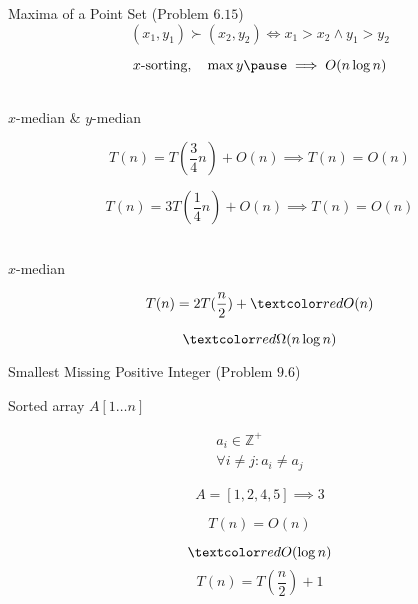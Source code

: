 \begin{frame}{}
  \begin{exampleblock}{Maxima of a Point Set (Problem $6.15$)}
    \[
      (x_1, y_1) \succ (x_2, y_2) \iff x_1 > x_2 \land y_1 > y_2
    \]
  \end{exampleblock}

  \pause
  \[
    x\text{-sorting}, \quad \max y \pause \implies O(n \log n)
  \]
\end{frame}

\begin{frame}{}
  \begin{center}
     \\[6pt]

    $x$-median \& $y$-median
  \end{center}

  \[
    T(n) = T(\frac{3}{4} n) + O(n) \implies T(n) = O(n)
  \]

  \[
    T(n) = 3T(\frac{1}{4} n) + O(n) \implies T(n) = O(n)
  \]
\end{frame}

\begin{frame}{}
  \begin{center}
      \\[6pt]

    $x$-median
  \end{center}

  \pause
  \[
    T(n) = 2T(\frac{n}{2}) + \red{O(n)}
  \]

  \pause
  \[
    \red{\Omega(n \log n)}
  \]
\end{frame}

\begin{frame}{}
  \begin{exampleblock}{Smallest Missing Positive Integer (Problem $9.6$)}
    \centerline{Sorted array $A[1 \ldots n]$}

    \vspace{-0.50cm}
    \begin{gather*}
      a_i \in \mathbb{Z}^{+} \\
      \forall i \neq j: a_i \neq a_j
    \end{gather*}

    \vspace{-0.30cm}
    \[
      A = [1,2,4,5] \implies 3
    \]
  \end{exampleblock}

  \pause
  \[
    T(n) = O(n)
  \]

  \pause
  \[
    \red{O(\log n)}
  \]
  \pause
  \[
    T(n) = T(\frac{n}{2}) + 1
  \]
\end{frame}

